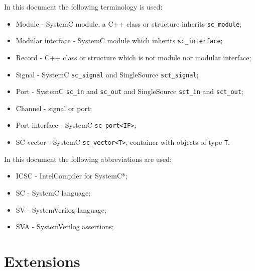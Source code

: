 In this document the following terminology is used:
%
\begin{itemize}
\item Module - SystemC module, a C++ class or structure inherits {\tt sc\_module};
\item Modular interface - SystemC module which inherits {\tt sc\_interface};
\item Record - C++ class or structure which is not module nor modular interface;
\item Signal - SystemC {\tt sc\_signal} and SingleSource {\tt sct\_signal};
\item Port - SystemC {\tt sc\_in} and {\tt sc\_out} and SingleSource {\tt sct\_in} and {\tt sct\_out};
\item Channel - signal or port;
\item Port interface - SystemC {\tt sc\_port<IF>};
\item SC vector - SystemC {\tt sc\_vector<T>}, container with objects of type {\tt T}.
\end{itemize}
%
In this document the following abbreviations are used:
%
\begin{itemize}
\item ICSC - Intel\textregistered Compiler for SystemC*;
\item SC - SystemC language;
\item SV - SystemVerilog language;
\item SVA - SystemVerilog assertions;
\end{itemize}




\ifdefined\INTEL

\else

\fi










\section{Extensions}\label{section:extensions}

\ifdefined\INTEL
 
\fi



%



